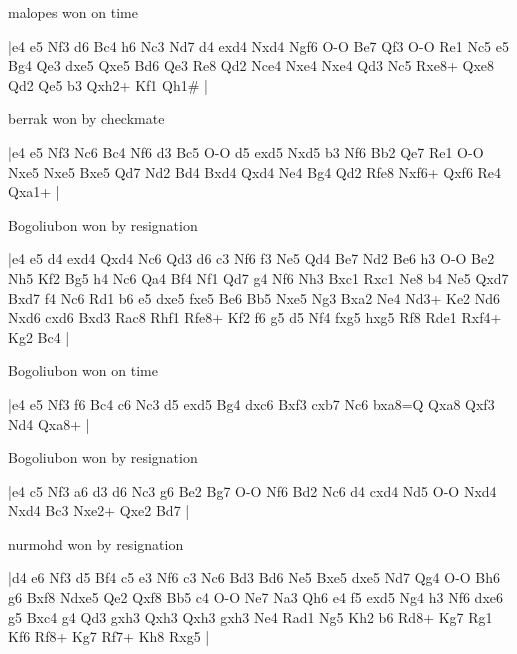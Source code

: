 \showboard

malopes won on time

\makegametitle
|e4 e5 Nf3 d6 Bc4 h6 Nc3 Nd7 d4 exd4 Nxd4 Ngf6 O-O Be7 Qf3 O-O Re1 Nc5 e5 Bg4 Qe3 dxe5 Qxe5 Bd6 Qe3 Re8 Qd2 Nce4 Nxe4 Nxe4 Qd3 Nc5 Rxe8+ Qxe8 Qd2 Qe5 b3 Qxh2+ Kf1 Qh1\#  |

\showboard

berrak won by checkmate

\makegametitle
|e4 e5 Nf3 Nc6 Bc4 Nf6 d3 Bc5 O-O d5 exd5 Nxd5 b3 Nf6 Bb2 Qe7 Re1 O-O Nxe5 Nxe5 Bxe5 Qd7 Nd2 Bd4 Bxd4 Qxd4 Ne4 Bg4 Qd2 Rfe8 Nxf6+ Qxf6 Re4 Qxa1+  |

\showboard

Bogoliubon won by resignation

\makegametitle
|e4 e5 d4 exd4 Qxd4 Nc6 Qd3 d6 c3 Nf6 f3 Ne5 Qd4 Be7 Nd2 Be6 h3 O-O Be2 Nh5 Kf2 Bg5 h4 Nc6 Qa4 Bf4 Nf1 Qd7 g4 Nf6 Nh3 Bxc1 Rxc1 Ne8 b4 Ne5 Qxd7 Bxd7 f4 Nc6 Rd1 b6 e5 dxe5 fxe5 Be6 Bb5 Nxe5 Ng3 Bxa2 Ne4 Nd3+ Ke2 Nd6 Nxd6 cxd6 Bxd3 Rac8 Rhf1 Rfe8+ Kf2 f6 g5 d5 Nf4 fxg5 hxg5 Rf8 Rde1 Rxf4+ Kg2 Bc4  |

\showboard

Bogoliubon won on time

\makegametitle
|e4 e5 Nf3 f6 Bc4 c6 Nc3 d5 exd5 Bg4 dxc6 Bxf3 cxb7 Nc6 bxa8=Q Qxa8 Qxf3 Nd4 Qxa8+  |

\showboard

Bogoliubon won by resignation

\makegametitle
|e4 c5 Nf3 a6 d3 d6 Nc3 g6 Be2 Bg7 O-O Nf6 Bd2 Nc6 d4 cxd4 Nd5 O-O Nxd4 Nxd4 Bc3 Nxe2+ Qxe2 Bd7  |

\showboard

nurmohd won by resignation

\makegametitle
|d4 e6 Nf3 d5 Bf4 c5 e3 Nf6 c3 Nc6 Bd3 Bd6 Ne5 Bxe5 dxe5 Nd7 Qg4 O-O Bh6 g6 Bxf8 Ndxe5 Qe2 Qxf8 Bb5 c4 O-O Ne7 Na3 Qh6 e4 f5 exd5 Ng4 h3 Nf6 dxe6 g5 Bxc4 g4 Qd3 gxh3 Qxh3 Qxh3 gxh3 Ne4 Rad1 Ng5 Kh2 b6 Rd8+ Kg7 Rg1 Kf6 Rf8+ Kg7 Rf7+ Kh8 Rxg5  |

